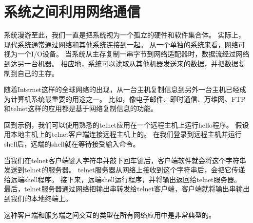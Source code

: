 \section{系统之间利用网络通信}
{
    系统漫游至此，我们一直是把系统视为一个孤立的硬件和软件集合体。
    实际上，现代系统通常通过网络和其他系统连接到一起。
    从一个单独的系统来看，网络可视为一个I/O设备。
    当系统从主存复制一串字节到网络适配器时，数据流经过网络到达另一台机器。
    相应地，系统可以读取从其他机器发送来的数据，并把数据复制到自己的主存。

    随着Internet这样的全球网络的出现，从一台主机复制信息到另外一台主机已经成为计算机系统最重要的用途之一。
    比如，像电子邮件、即时通信、万维网、FTP和telnet这样的应用都是基于网络复制信息的功能。

    回到示例，我们可以使用熟悉的telnet应用在一个远程主机上运行hello程序。
    假设用本地主机上的telnet客户端连接远程主机上的。
    在我们登录到远程主机并运行shell后，远端的shell就在等待接受输入命令。

    当我们在telnet客户端键入字符串并敲下回车键后，客户端软件就会将这个字符串发送到telnet的服务器。
    telnet服务器从网络上接收到这个字符串后，会把它传递给远端shell程序。
    接下来，远端shell运行程序，并将输出返回给telnet服务器。
    最后，telnet服务器通过网络把输出串转发给telnet客户端，客户端就将输出串输出到我们的本地终端上。

    这种客户端和服务端之间交互的类型在所有网络应用中是非常典型的。
}

\endinput

